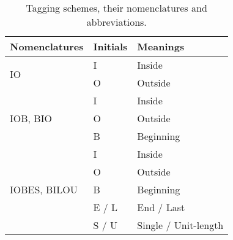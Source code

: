 \begingroup

\begin{table}[!t]

\caption{Tagging schemes, their nomenclatures and abbreviations.}
\label{tab:tagging-schemes}

\centering

\begin{tabular}{lll}

\toprule

Nomenclatures & Initials & Meanings\\

\midrule

\multirow{2}{*}[-0pt]{IO} & I & Inside\\

& O & Outside\\

\midrule

& I & Inside\\

IOB, BIO & O & Outside\\

& B & Beginning\\

\midrule

& I & Inside\\

& O & Outside\\

IOBES, BILOU & B & Beginning\\

& E / L & End / Last\\

& S / U & Single / Unit-length\\

\bottomrule

\end{tabular}
\end{table}
\endgroup

